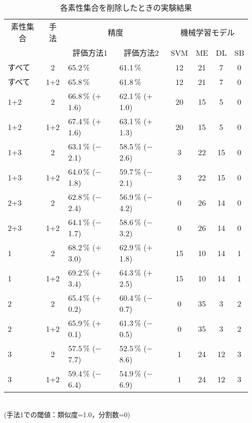 \begin{table}[htbp]
  \begin{center}
    \caption{各素性集合を削除したときの実験結果}
    \label{table:exp:feature}
    \begin{tabular}[c]{|l|c|l|l|c|c|c|c|}
      \hline
      \multicolumn{1}{|c|}{素性集合} & 手法 & \multicolumn{2}{c|}{精度}
      & \multicolumn{4}{c|}{機械学習モデル}\\
      \cline{3-8}
      & & \multicolumn{1}{c|}{評価方法1} & \multicolumn{1}{c|}{評価方法2} 
      & SVM & ME & DL & SB\\
      \hline
      すべて & 2 & 65.2\,\% & 61.1\,\% & 12 & 21 & 7 & 0\\
      すべて & 1+2 & 65.8\,\% & 61.8\,\% & 12 & 21 & 7 & 0\\
      1+2 & 2 
      & 66.8\,\% ($+$1.6) & 62.1\,\% ($+$1.0) & 20 & 15 & 5 & 0\\
      1+2 & 1+2
      & 67.4\,\% ($+$1.6) & 63.1\,\% ($+$1.3) & 20 & 15 & 5 & 0\\
      1+3 & 2 
      & 63.1\,\% ($-$2.1) & 58.5\,\% ($-$2.6) & 3 & 22 & 15 & 0\\
      1+3 & 1+2
      & 64.0\,\% ($-$1.8) & 59.7\,\% ($-$2.1) & 3 & 22 & 15 & 0\\
      2+3 & 2 
      & 62.8\,\% ($-$2.4) & 56.9\,\% ($-$4.2) & 0 & 26 & 14 & 0\\
      2+3 & 1+2
      & 64.1\,\% ($-$1.7) & 58.6\,\% ($-$3.2) & 0 & 26 & 14 & 0\\
      1 & 2 
      & 68.2\,\% ($+$3.0) & 62.9\,\% ($+$1.8) & 15 & 10 & 14 & 1\\
      1 & 1+2
      & 69.2\,\% ($+$3.4) & 64.3\,\% ($+$2.5) & 15 & 10 & 14 & 1\\
      2 & 2 
      & 65.4\,\% ($+$0.2) & 60.4\,\% ($-$0.7) & 0 & 35 & 3 & 2\\
      2 & 1+2
      & 65.9\,\% ($+$0.1) & 61.3\,\% ($-$0.5) & 0 & 35 & 3 & 2\\
      3 & 2 
      & 57.5\,\% ($-$7.7) & 52.5\,\% ($-$8.6) & 1 & 24 & 12 & 3\\
      3 & 1+2
      & 59.4\,\% ($-$6.4) & 54.9\,\% ($-$6.9) & 1 & 24 & 12 & 3\\
      \hline
    \end{tabular}\\
    \vspace*{1em}
    (手法1での閾値：類似度=1.0，分割数=0)
  \end{center}
\end{table}

